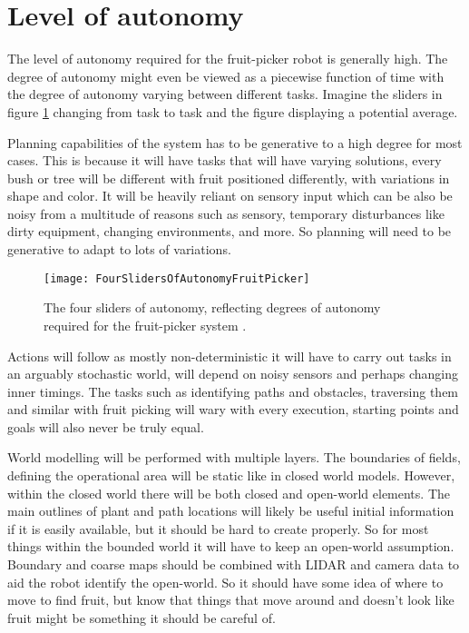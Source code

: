 \documentclass[%
oneside,    %
project,    %
nosummary   %
]{USN-MSc}
\begin{document}
\section{Level of autonomy}

The level of autonomy required for the fruit-picker robot is generally high. The degree of autonomy might even be viewed as a piecewise function of time with the degree of autonomy varying between different tasks. Imagine the sliders in figure \ref{fig:fourSlidersFruit} changing from task to task and the figure displaying a potential average.

Planning capabilities of the system has to be generative to a high degree for most cases. This is because it will have tasks that will have varying solutions, every bush or tree will be different with fruit positioned differently, with variations in shape and color. It will be heavily reliant on sensory input which can be also be noisy from a multitude of reasons such as sensory, temporary disturbances like dirty equipment, changing environments, and more. So planning will need to be generative to adapt to lots of variations.

\begin{figure}[!ht]
  \centering
  \texttt{[image: FourSlidersOfAutonomyFruitPicker]}
  \caption{The four sliders of autonomy, reflecting degrees of autonomy required for the fruit-picker system \cite{murphy2000introduction}.}
  \label{fig:fourSlidersFruit}
\end{figure}

Actions will follow as mostly non-deterministic it will have to carry out tasks in an arguably stochastic world, will depend on noisy sensors and perhaps changing inner timings. The tasks such as identifying paths and obstacles, traversing them and similar with fruit picking will wary with every execution, starting points and goals will also never be truly equal.

World modelling will be performed with multiple layers. The boundaries of fields, defining the operational area will be static like in closed world models. However, within the closed world there will be both closed and open-world elements. The main outlines of plant and path locations will likely be useful initial information if it is easily available, but it should be hard to create properly. So for most things within the bounded world it will have to keep an open-world assumption. Boundary and coarse maps should be combined with LIDAR and camera data to aid the robot identify the open-world. So it should have some idea of where to move to find fruit, but know that things that move around and doesn't look like fruit might be something it should be careful of.
\end{document}
